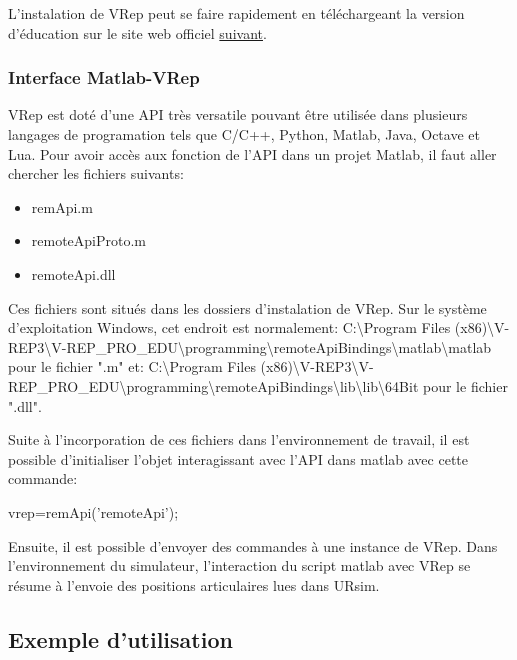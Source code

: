 \documentclass[root.tex]{subfiles}
\begin{document}
L'instalation de VRep peut se faire rapidement en téléchargeant la version d'éducation sur le site web officiel \href{http://www.coppeliarobotics.com/downloads.html}{suivant}.

\subsubsection{Interface Matlab-VRep}

VRep est doté d'une API très versatile pouvant être utilisée dans plusieurs langages de programation tels que C/C++, Python, Matlab, Java, Octave et Lua.
Pour avoir accès aux fonction de l'API dans un projet Matlab, il faut aller chercher les fichiers suivants:
\begin{itemize}
\item remApi.m
\item remoteApiProto.m
\item remoteApi.dll
\end{itemize}

Ces fichiers sont situés dans les dossiers d'instalation de VRep.
Sur le système d'exploitation Windows, cet endroit est normalement: 
\newline
C:\textbackslash Program Files (x86)\textbackslash V-REP3\textbackslash V-REP\_PRO\_EDU\textbackslash programming\textbackslash remoteApiBindings\textbackslash matlab\textbackslash matlab
\newline
pour le fichier ".m" et:
\newline
C:\textbackslash Program Files (x86)\textbackslash V-REP3\textbackslash V-REP\_PRO\_EDU\textbackslash programming\textbackslash remoteApiBindings\textbackslash lib\textbackslash lib\textbackslash 64Bit
\newline
pour le fichier ".dll".
\newline

Suite à l'incorporation de ces fichiers dans l'environnement de travail, il est possible d'initialiser l'objet interagissant avec l'API dans matlab avec cette commande:
\newline

vrep=remApi('remoteApi');
\newline

Ensuite, il est possible d'envoyer des commandes à une instance de VRep.
Dans l'environnement du simulateur, l'interaction du script matlab avec VRep se résume à l'envoie des positions articulaires lues dans URsim.

\subsection{Exemple d'utilisation}
\end{document}
